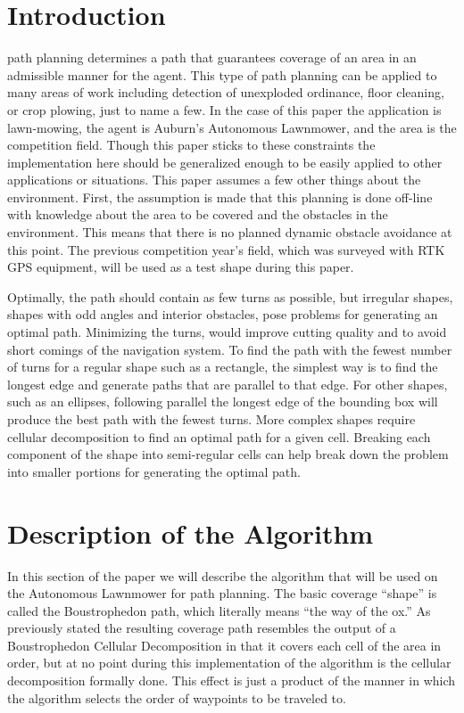 \documentclass[journal]{IEEEtran}
\begin{document}
  \section{Introduction}
   path planning determines a path that guarantees coverage of an area in an admissible manner for the agent.  This type of path planning can be applied to many areas of work including detection of unexploded ordinance, floor cleaning, or crop plowing, just to name a few. In the case of this paper the application is lawn-mowing, the agent is Auburn's Autonomous Lawnmower, and the area is the competition field.  Though this paper sticks to these constraints the implementation here should be generalized enough to be easily applied to other applications or situations.  This paper assumes a few other things about the environment.  First, the assumption is made that this planning is done off-line with knowledge about the area to be covered and the obstacles in the environment.  This means that there is no planned dynamic obstacle avoidance at this point.  The previous competition year's field, which was surveyed with RTK GPS equipment, will be used as a test shape during this paper.
  
  Optimally, the path should contain as few turns as possible, but irregular shapes, shapes with odd angles and interior obstacles, pose problems for generating an optimal path. Minimizing the turns, would improve cutting quality and to avoid short comings of the navigation system. To find the path with the fewest number of turns for a regular shape such as a rectangle, the simplest way is to find the longest edge and generate paths that are parallel to that edge. For other shapes, such as an ellipses, following parallel the longest edge of the bounding box will produce the best path with the fewest turns. More complex shapes require cellular decomposition to find an optimal path for a given cell. Breaking each component of the shape into semi-regular cells can help break down the problem into smaller portions for generating the optimal path.\cite{1307193}
  
  \section{Description of the Algorithm}
  In this section of the paper we will describe the algorithm that will be used on the Autonomous Lawnmower for path planning.  The basic coverage ``shape'' is called the Boustrophedon path, which literally means ``the way of the ox.''\cite{Choset_1997_1416}  As previously stated the resulting coverage path resembles the output of a Boustrophedon Cellular Decomposition in that it covers each cell of the area in order, but at no point during this implementation of the algorithm is the cellular decomposition formally done.  This effect is just a product of the manner in which the algorithm selects the order of waypoints to be traveled to.
  
\end{document}
